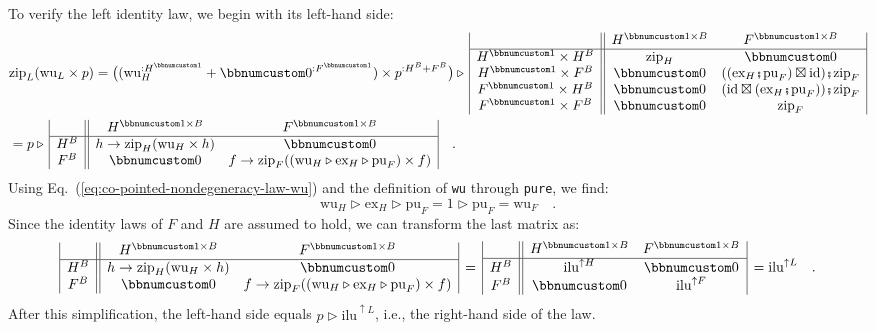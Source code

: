 To verify the left identity law, we begin with its left-hand side:
\begin{align*}
 & \text{zip}_{L}(\text{wu}_{L}\times p)=\big((\text{wu}_{H}^{:H^{\bbnum 1}}+\bbnum 0^{:F^{\bbnum 1}})\times p^{:H^{B}+F^{B}}\big)\triangleright\,\begin{array}{|c||cc|}
 & H^{\bbnum 1\times B} & F^{\bbnum 1\times B}\\
\hline H^{\bbnum 1}\times H^{B} & \text{zip}_{H} & \bbnum 0\\
H^{\bbnum 1}\times F^{B} & \bbnum 0 & ((\text{ex}_{H}\bef\text{pu}_{F})\boxtimes\text{id})\bef\text{zip}_{F}\\
F^{\bbnum 1}\times H^{B} & \bbnum 0 & (\text{id}\boxtimes(\text{ex}_{H}\bef\text{pu}_{F}))\bef\text{zip}_{F}\\
F^{\bbnum 1}\times F^{B} & \bbnum 0 & \text{zip}_{F}
\end{array}\\
 & =p\triangleright\,\begin{array}{|c||cc|}
 & H^{\bbnum 1\times B} & F^{\bbnum 1\times B}\\
\hline H^{B} & h\rightarrow\text{zip}_{H}(\text{wu}_{H}\times h) & \bbnum 0\\
F^{B} & \bbnum 0 & f\rightarrow\text{zip}_{F}((\text{wu}_{H}\triangleright\text{ex}_{H}\triangleright\text{pu}_{F})\times f)
\end{array}\quad.
\end{align*}
Using Eq.~(\ref{eq:co-pointed-nondegeneracy-law-wu}) and the definition
of \lstinline!wu! through \lstinline!pure!, we find:
\[
\text{wu}_{H}\triangleright\text{ex}_{H}\triangleright\text{pu}_{F}=1\triangleright\text{pu}_{F}=\text{wu}_{F}\quad.
\]
Since the identity laws of $F$ and $H$ are assumed to hold, we can
transform the last matrix as:
\[
\begin{array}{|c||cc|}
 & H^{\bbnum 1\times B} & F^{\bbnum 1\times B}\\
\hline H^{B} & h\rightarrow\text{zip}_{H}(\text{wu}_{H}\times h) & \bbnum 0\\
F^{B} & \bbnum 0 & f\rightarrow\text{zip}_{F}((\text{wu}_{H}\triangleright\text{ex}_{H}\triangleright\text{pu}_{F})\times f)
\end{array}\,=\,\begin{array}{|c||cc|}
 & H^{\bbnum 1\times B} & F^{\bbnum 1\times B}\\
\hline H^{B} & \text{ilu}^{\uparrow H} & \bbnum 0\\
F^{B} & \bbnum 0 & \text{ilu}^{\uparrow F}
\end{array}\,=\text{ilu}^{\uparrow L}\quad.
\]
After this simplification, the left-hand side equals $p\triangleright\text{ilu}^{\uparrow L}$,
i.e., the right-hand side of the law.

